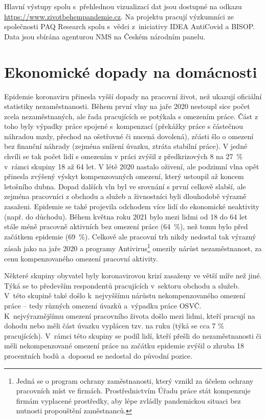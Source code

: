 Hlavní výstupy spolu s přehlednou vizualizací dat jsou dostupné na odkazu \url{https://www.zivotbehempandemie.cz}. Na projektu pracují výzkumníci ze společnosti PAQ Research spolu s vědci z iniciativy IDEA AntiCovid a BISOP. Data jsou sbírána agenturou NMS na Českém národním panelu.

\section*{Ekonomické dopady na domácnosti}
\label{Ekonomicke_dopady}

Epidemie koronaviru přinesla vyšší dopady na pracovní život, než ukazují oficiální statistiky nezaměstnanosti. Během první vlny na jaře 2020 nestoupl sice počet zcela nezaměstnaných, ale řada pracujících se potýkala s omezením práce. Část z toho byly výpadky práce spojené s kompenzací (překážky práce s částečnou náhradou mzdy, přechod na ošetřovné či nucená dovolená), zčásti šlo o omezení bez finanční náhrady (zejména snížení úvazku, ztráta stabilní práce). V jedné chvíli se tak počet lidí s omezením v práci zvýšil z předkrizových 8 na 27 \% v rámci skupiny 18 až 64 let. V létě 2020 nastalo oživení, ale podzimní vlna opět přinesla zvýšený výskyt kompenzovaných omezení, který ustoupil až koncem letošního dubna. Dopad dalších vln byl ve srovnání s první celkově slabší, ale zejména pracovníci z obchodu a služeb a živnostníci byli dlouhodobě výrazně zasaženi. Epidemie se také projevila odchodem více lidí do ekonomické neaktivity (např. do důchodu). Během května roku 2021 bylo mezi lidmi od 18 do 64 let stále méně pracovně aktivních bez omezení práce (64 \%), než tomu bylo před začátkem epidemie (69 \%). Celkově ale pracovní trh nikdy nedostal tak výrazný zásah jako na jaře 2020 a programy Antivirus\footnote{Jedná se o program ochrany zaměstnanosti, který vznikl za účelem ochrany pracovních míst ve firmách. Prostřednictvím Úřadu práce stát kompenzuje firmám vyplacené prostředky, aby lépe zvládly pandemickou situaci bez nutnosti propouštění zaměstnanců.} omezily nárůst nezaměstnanost, za cenu kompenzovaného omezení pracovní aktivity.

Některé skupiny obyvatel byly koronavirovou krizí zasaženy ve větší míře než jiné. Týká se to především respondentů pracujících v sektoru obchodu a služeb. V této skupině také došlo k nejvyššímu nárůstu nekompenzovaného omezení práce – tedy různých omezení úvazků a výpadku práce OSVČ. K nejvýraznějšímu omezení pracovního života došlo mezi lidmi, kteří pracují na dohodu nebo měli část úvazku vyplácen tzv. na ruku (týká se cca 7 \% pracujících). V rámci této skupiny se podíl lidí, kteří přešli do nezaměstnanosti či měli nekompenzované omezení práce na začátku epidemie zvýšil o zhruba 18 procentních bodů a doposud se nedostal do původní pozice.

